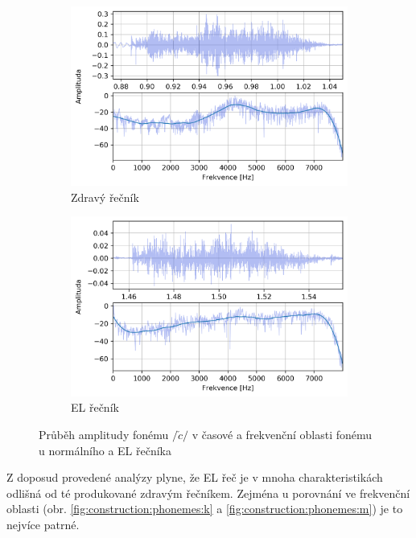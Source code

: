 \begin{figure}[htpb]
  \centering
  \begin{subfigure}[b]{0.45\textwidth}
    \includegraphics[width=\textwidth]{./ch5-construction/img/signal-normal_c.png}
    \caption{Zdravý řečník}
    \label{fig:construction:phonemes:c:normal}
  \end{subfigure}
  \begin{subfigure}[b]{0.45\textwidth}
    \includegraphics[width=\textwidth]{./ch5-construction/img/signal-el_c.png}
    \caption{EL řečník}
    \label{fig:construction:phonemes:c:el}
  \end{subfigure}
  \caption{Průběh amplitudy fonému $/\check{c}/$ v časové a frekvenční oblasti fonému u normálního a EL řečníka}
  \label{fig:construction:phonemes:c}
\end{figure}

Z doposud provedené analýzy plyne, že EL řeč je v mnoha charakteristikách odlišná od té produkované zdravým řečníkem. Zejména u porovnání ve frekvenční oblasti (obr. \ref{fig:construction:phonemes:k} a \ref{fig:construction:phonemes:m}) je to nejvíce patrné.

